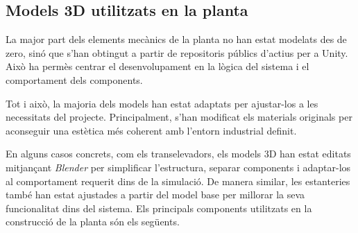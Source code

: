 \documentclass[a4paper,11pt,DIV=13,headings=normal,abstract=true,twoside=semi]{article}
\begin{document}
\subsection{Models 3D utilitzats en la planta}

La major part dels elements mecànics de la planta no han estat modelats des de zero, sinó que s'han obtingut a partir de repositoris públics d'actius per a Unity. Això ha permès centrar el desenvolupament en la lògica del sistema i el comportament dels components.

Tot i això, la majoria dels models han estat adaptats per ajustar-los a les necessitats del projecte. Principalment, s'han modificat els materials originals per aconseguir una estètica més coherent amb l'entorn industrial definit.

En alguns casos concrets, com els transelevadors, els models 3D han estat editats mitjançant \textit{Blender} \cite{blender_download} per simplificar l'estructura, separar components i adaptar-los al comportament requerit dins de la simulació. De manera similar, les estanteries també han estat ajustades a partir del model base per millorar la seva funcionalitat dins del sistema. Els principals components utilitzats en la construcció de la planta són els següents. 
\end{document}
